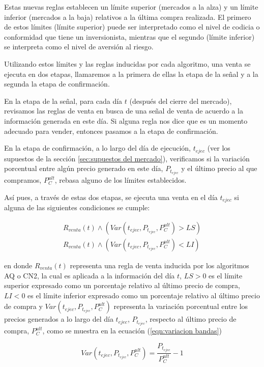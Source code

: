 \documentclass[12pt]{report}
\theoremstyle{break}
\theoremstyle{break}
\begin{document}
Estas nuevas reglas establecen un límite superior (mercados a la alza) y un límite inferior (mercados a la baja) relativos a la última compra realizada. El primero de estos límites (límite superior) puede ser interpretado como el nivel de codicia o conformidad que tiene un inversionista, mientras que el segundo (límite inferior) se interpreta como el nivel de aversión al riesgo.

Utilizando estos límites y las reglas inducidas por cada algoritmo, una venta se ejecuta en dos etapas, llamaremos a la primera de ellas la etapa de la señal y a la segunda la etapa de confirmación.

En la etapa de la señal, para cada día $t$ (después del cierre del mercado), revisamos las reglas de venta en busca de una señal de venta de acuerdo a la información generada en este día. Si alguna regla nos dice que es un momento adecuado para vender, entonces pasamos a la etapa de confirmación.

En la etapa de confirmación, a lo largo del día de ejecución, $t_{ejec}$ (ver los supuestos de la sección \ref{sec:supuestos del mercado}), verificamos si la variación porcentual entre algún precio generado en este día, $P_{t_{ejec}}$ y el último precio al que compramos, $P_{C}^{ult}$, rebasa alguno de los límites establecidos.

Así pues, a través de estas dos etapas, se ejecuta una venta en el día $t_{ejec}$ si alguna de las siguientes condiciones se cumple:

\begin{align}
R_{venta}(t) \wedge (Var(t_{ejec}, P_{t_{ejec}}, P_{C}^{ult} ) > LS) \label{eqn:Venta limite sup}\\
R_{venta}(t) \wedge (Var(t_{ejec}, P_{t_{ejec}}, P_{C}^{ult} ) < LI) \label{eqn:Venta limite inf}
\end{align}

en donde $R_{venta}(t)$ representa una regla de venta inducida por los algoritmos AQ o CN2, la cual es aplicada a la información del día $t$, $LS>0$ es el límite superior expresado como un porcentaje relativo al último precio de compra, $LI<0$ es el límite inferior expresado como un porcentaje relativo al último precio de compra y $Var(t_{ejec}, P_{t_{ejec}}, P_{C}^{ult} )$ representa la variación porcentual entre los precios generados a lo largo del día $t_{ejec}$, $P_{t_{ejec}}$, respecto al último precio de compra, $P_{C}^{ult}$, como se muestra en la ecuación (\ref{eqn:variacion bandas})

\begin{equation} \label{eqn:variacion bandas}
Var(t_{ejec}, P_{t_{ejec}}, P_{C}^{ult} ) = \dfrac{P_{t_{ejec}}} {P_{C}^{ult}} - 1
\end{equation}
\end{document}
